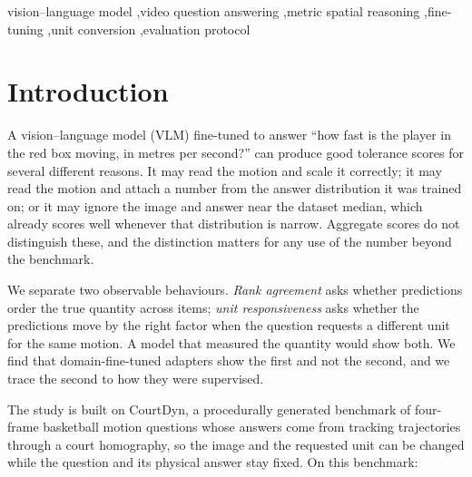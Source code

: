 \documentclass[preprint,number]{elsarticle}
\begin{document}
\begin{frontmatter}
\begin{keyword}
vision--language model \sep video question answering \sep metric spatial
reasoning \sep fine-tuning \sep unit conversion \sep evaluation protocol
\end{keyword}

\end{frontmatter}

\section{Introduction}
\label{sec:intro}

A vision--language model (VLM) fine-tuned to answer ``how fast is the player in
the red box moving, in metres per second?'' can produce good tolerance scores
for several different reasons. It may read the motion and scale it correctly;
it may read the motion and attach a number from the answer distribution it was
trained on; or it may ignore the image and answer near the dataset median,
which already scores well whenever that distribution is narrow. Aggregate
scores do not distinguish these, and the distinction matters for any use of the
number beyond the benchmark.

We separate two observable behaviours. \emph{Rank agreement} asks whether
predictions order the true quantity across items; \emph{unit responsiveness}
asks whether the predictions move by the right factor when the question
requests a different unit for the same motion. A model that measured the
quantity would show both. We find that domain-fine-tuned adapters show the
first and not the second, and we trace the second to how they were supervised.

The study is built on CourtDyn, a procedurally generated benchmark of
four-frame basketball motion questions whose answers come from tracking
trajectories through a court homography, so the image and the requested unit
can be changed while the question and its physical answer stay fixed. On
this benchmark:
\end{document}
